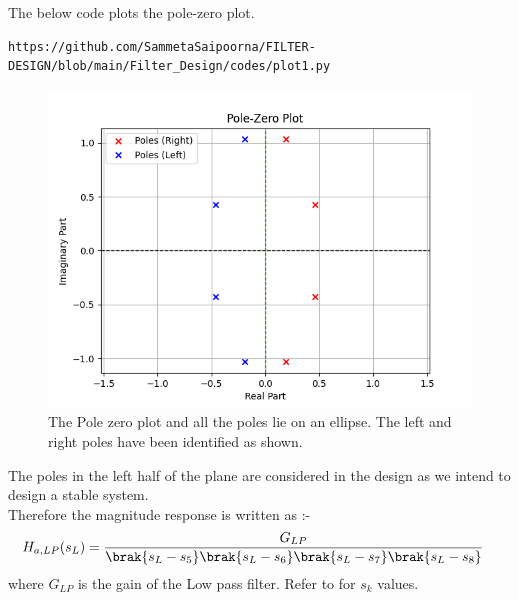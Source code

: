 \documentclass{article}
\begin{document}
\begin{enumerate}
The below code plots the pole-zero plot.
\begin{lstlisting}
https://github.com/SammetaSaipoorna/FILTER-DESIGN/blob/main/Filter_Design/codes/plot1.py
\end{lstlisting}
\begin{figure}[H]
\centering
\includegraphics[width=1\columnwidth]{figs/Pole_Zero_plt.png}
\caption{The Pole zero plot and all the poles lie on an ellipse. The left and right poles have been identified as shown.}
\label{fig:pole_zero_plt}
\end{figure}
The poles in the left half of the plane are considered in the design as we intend to design a stable system.\\
Therefore the magnitude response is written as :- 
\begin{align}
    H_{a,LP}(s_L) &= \frac{G_{LP}}{\brak{s_L-s_5}\brak{s_L-s_6}\brak{s_L-s_7}\brak{s_L-s_8}}
\end{align}
where $G_{LP}$ is the gain of the Low pass filter. Refer to  for $s_k$ values.\\


\end{enumerate}
\end{document}
